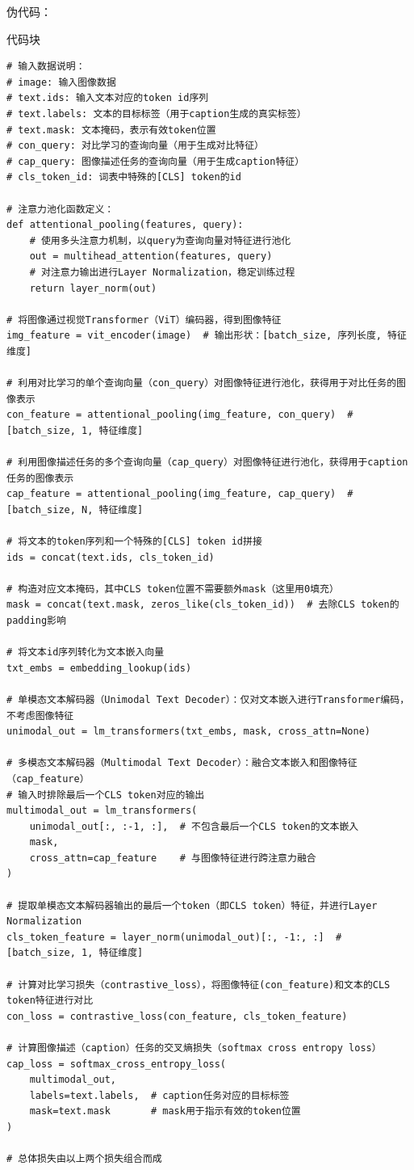 \documentclass[zihao=false,fontset=windows]{ctexart}
\newcommand{\codehead}{{\small\ttfamily\color{feishuGray}代码块}\par\vspace{-0.15em}}
\begin{document}
伪代码：\par
\begin{feishucode}
\codehead
\begin{lstlisting}
# 输入数据说明：
# image: 输入图像数据
# text.ids: 输入文本对应的token id序列
# text.labels: 文本的目标标签（用于caption生成的真实标签）
# text.mask: 文本掩码，表示有效token位置
# con_query: 对比学习的查询向量（用于生成对比特征）
# cap_query: 图像描述任务的查询向量（用于生成caption特征）
# cls_token_id: 词表中特殊的[CLS] token的id

# 注意力池化函数定义：
def attentional_pooling(features, query):
    # 使用多头注意力机制，以query为查询向量对特征进行池化
    out = multihead_attention(features, query)
    # 对注意力输出进行Layer Normalization，稳定训练过程
    return layer_norm(out)

# 将图像通过视觉Transformer（ViT）编码器，得到图像特征
img_feature = vit_encoder(image)  # 输出形状：[batch_size, 序列长度, 特征维度]

# 利用对比学习的单个查询向量（con_query）对图像特征进行池化，获得用于对比任务的图像表示
con_feature = attentional_pooling(img_feature, con_query)  # [batch_size, 1, 特征维度]

# 利用图像描述任务的多个查询向量（cap_query）对图像特征进行池化，获得用于caption任务的图像表示
cap_feature = attentional_pooling(img_feature, cap_query)  # [batch_size, N, 特征维度]

# 将文本的token序列和一个特殊的[CLS] token id拼接
ids = concat(text.ids, cls_token_id)

# 构造对应文本掩码，其中CLS token位置不需要额外mask（这里用0填充）
mask = concat(text.mask, zeros_like(cls_token_id))  # 去除CLS token的padding影响

# 将文本id序列转化为文本嵌入向量
txt_embs = embedding_lookup(ids)

# 单模态文本解码器（Unimodal Text Decoder）：仅对文本嵌入进行Transformer编码，不考虑图像特征
unimodal_out = lm_transformers(txt_embs, mask, cross_attn=None)

# 多模态文本解码器（Multimodal Text Decoder）：融合文本嵌入和图像特征（cap_feature）
# 输入时排除最后一个CLS token对应的输出
multimodal_out = lm_transformers(
    unimodal_out[:, :-1, :],  # 不包含最后一个CLS token的文本嵌入
    mask,
    cross_attn=cap_feature    # 与图像特征进行跨注意力融合
)

# 提取单模态文本解码器输出的最后一个token（即CLS token）特征，并进行Layer Normalization
cls_token_feature = layer_norm(unimodal_out)[:, -1:, :]  # [batch_size, 1, 特征维度]

# 计算对比学习损失（contrastive_loss），将图像特征(con_feature)和文本的CLS token特征进行对比
con_loss = contrastive_loss(con_feature, cls_token_feature)

# 计算图像描述（caption）任务的交叉熵损失（softmax cross entropy loss）
cap_loss = softmax_cross_entropy_loss(
    multimodal_out,
    labels=text.labels,  # caption任务对应的目标标签
    mask=text.mask       # mask用于指示有效的token位置
)

# 总体损失由以上两个损失组合而成
\end{lstlisting}
\end{feishucode}
\end{document}

